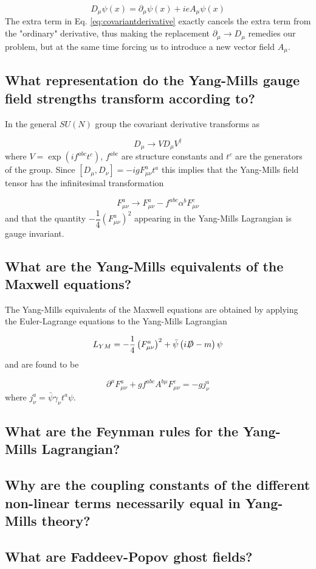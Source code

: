 \documentclass[paper=a4, fontsize=11pt]{scrartcl} %
\numberwithin{equation}{section} %
\numberwithin{figure}{section} %
\numberwithin{table}{section} %
\newcommand{\parentheses}[1]{\ensuremath{\left( #1 \right)}}
\newcommand{\commutator}[1]{\ensuremath{\left[ #1 \right]}}
\begin{document}
\begin{equation}
D_{\mu}\psi(x)= \partial_{\mu}\psi(x)+ieA_{\mu}\psi(x)
\label{eq:covariantderivative}
\end{equation}
The extra term in Eq. \eqref{eq:covariantderivative} exactly cancels the extra term from the "ordinary" derivative, thus making the replacement $\partial_{\mu} \rightarrow D_{\mu}$ remedies our problem, but at the same time forcing us to introduce a new vector field $A_{\mu}$.

\subsection{What representation do the Yang-Mills gauge field strengths transform according to?}
In the general $SU(N)$ group the covariant derivative transforms as

\begin{equation}
D_{\mu} \rightarrow V D_{\mu} V^{\dagger}
\end{equation}
where $V=\exp \parentheses{if^{abc}t^{c}}$, $f^{abc}$ are structure constants and $t^c$ are the generators of the group. Since $\commutator{D_{\mu}, D_{\nu}}=-igF^{a}_{\mu\nu}t^a$ this implies that 
the Yang-Mills field tensor has the infinitesimal transformation

\begin{equation}
F^{a}_{\mu\nu} \rightarrow F^{a}_{\mu\nu} - f^{abc} \alpha^b F^{c}_{\mu\nu}
\end{equation}
and that the quantity $-\dfrac{1}{4}\parentheses{F^{a}_{\mu\nu}}^2$ appearing in the Yang-Mills Lagrangian is gauge invariant.

\subsection{What are the Yang-Mills equivalents of the Maxwell equations?}
The Yang-Mills equivalents of the Maxwell equations are obtained by applying the Euler-Lagrange equations to the Yang-Mills Lagrangian

\begin{equation}
L_{YM}=-\dfrac{1}{4}\parentheses{F^{a}_{\mu\nu}}^2+\bar{\psi} \parentheses{i \slashed{D}-m} \psi
\end{equation}
and are found to be

\begin{equation}
\partial^{\mu} F^{a}_{\mu\nu} + g f^{abc} A^{b\mu} F^{c}_{\mu\nu} = -gj^{a}_{\nu}
\end{equation}
where $j^{a}_{\nu}=\bar{\psi} \gamma_{\nu} t^a \psi$. 

\subsection{What are the Feynman rules for the Yang-Mills Lagrangian?}

\subsection{Why are the coupling constants of the different non-linear terms necessarily equal in Yang-Mills theory?}

\subsection{What are Faddeev-Popov ghost fields?}
\end{document}
